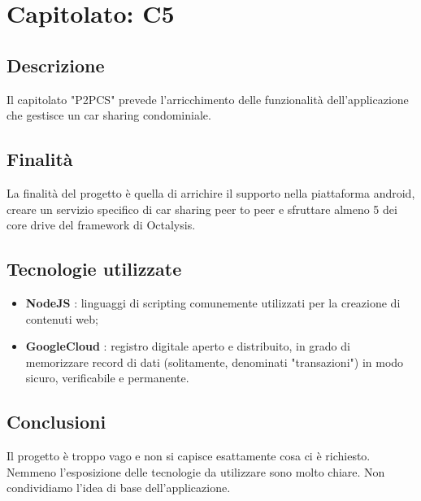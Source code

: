 \section{Capitolato: C5}
	\subsection{Descrizione}
		Il capitolato "P2PCS" prevede l'arricchimento delle funzionalità dell'applicazione che gestisce un car sharing condominiale.
	\subsection{Finalità}
		La finalità del progetto è quella di arrichire il supporto nella piattaforma android, creare un servizio specifico di car sharing peer to peer e sfruttare almeno 5 dei core drive     del framework di Octalysis.
	\subsection{Tecnologie utilizzate}
		\begin{itemize}
			\item \textbf{NodeJS} : linguaggi di scripting comunemente utilizzati per la creazione di contenuti web;
			\item \textbf{GoogleCloud} : registro digitale aperto e distribuito, in grado di memorizzare record di dati (solitamente, denominati "transazioni") in modo sicuro, verificabile e permanente.
		\end{itemize}
	\subsection{Conclusioni}
		Il progetto è troppo vago e non si capisce esattamente cosa ci è richiesto. Nemmeno l'esposizione delle tecnologie da utilizzare sono molto chiare.
		Non condividiamo l'idea di base dell'applicazione. 